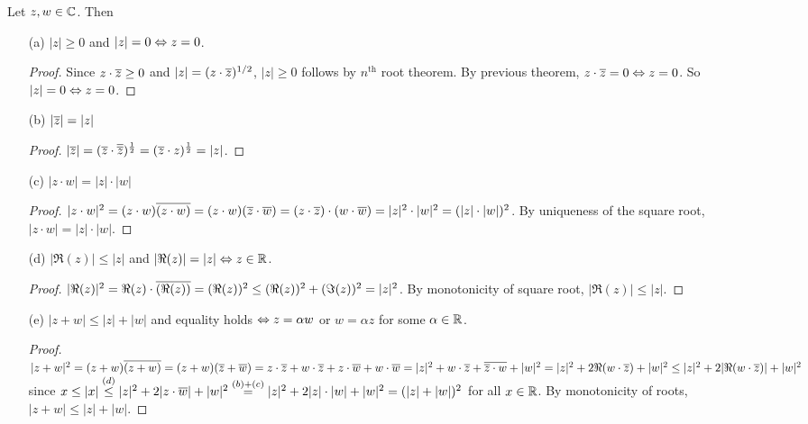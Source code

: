 \documentclass[]{article}
\begin{document}
\begin{theorem}
	Let $z,w\in\mathbb{C}$. Then
	\begin{enumerate}
		\item[(a)] $|z|\geq 0$ and $|z|= 0 \Leftrightarrow z= 0$.
		\begin{proof}
			Since $z\cdot \overline{z} \geq 0$ and $|z| = (z\cdot\overline{z})^{1/2}$, $|z|\geq 0$ follows by $n^\text{th}$ root theorem. By previous theorem, $z\cdot \overline{z} = 0\Leftrightarrow z = 0$. So $|z|=0\Leftrightarrow z = 0$.
		\end{proof}
		\item[(b)] $|\overline{z}| = |z|$
		\begin{proof}
			$|\overline{z}| = (\overline{z}\cdot \overline{\overline{z}})^\frac{1}{2} = (\overline{z}\cdot z)^\frac{1}{2} = |z|$.
		\end{proof}
		\item[(c)] $|z\cdot w| = |z|\cdot|w|$
		\begin{proof}
			$|z\cdot w|^2 = (z\cdot w)\overline{(z\cdot w)} = (z\cdot w)(\overline{z}\cdot \overline{w}) = (z\cdot \overline{z})\cdot(w\cdot\overline{w}) = |z|^2\cdot |w|^2 = (|z|\cdot|w|)^2$. By uniqueness of the square root, $|z\cdot w| = |z|\cdot |w|$. 
		\end{proof}
		\item[(d)] $|\Re (z)| \leq |z|$ and $|\Re(z)|=|z|\Leftrightarrow z\in\mathbb{R}$.
		\begin{proof}
			$|\Re(z)|^2 = \Re(z)\cdot \overline{(\Re(z))} = (\Re(z))^2 \leq (\Re(z))^2 + (\Im(z))^2 = |z|^2$. By monotonicity of square root, $|\Re(z)|\leq |z|$.
		\end{proof}
		\item[(e)] $|z+w|\leq |z|+|w|$ and equality holds $\Leftrightarrow z = \alpha w$ or $w = \alpha z$ for some $\alpha\in\mathbb{R}$.
		\begin{proof}
			$|z+w|^2 = (z+w)\overline{(z+w)} = (z+w)(\overline{z}+\overline{w}) = z\cdot \overline{z} + w\cdot \overline{z} + z\cdot \overline{w} + w\cdot\overline{w} = |z|^2 + w\cdot\overline{z} + \overline{\overline{z} \cdot w} + |w|^2 = |z|^2 + 2\Re(w\cdot \overline{z}) + |w|^2 \leq |z|^2 + 2|\Re(w\cdot \overline{z})| + |w|^2$ since $x\leq |x| \overset{(d)}{\leq} |z|^2 + 2|z\cdot\overline{w}| + |w|^2 \overset{(b)+(c)}{=} |z|^2 + 2|z|\cdot|w| + |w|^2 = (|z|+|w|)^2$ for all $x\in\mathbb{R}$. By monotonicity of roots, $|z+w| \leq |z| + |w|$.
		\end{proof}
	\end{enumerate}
\end{theorem}
\end{document}
